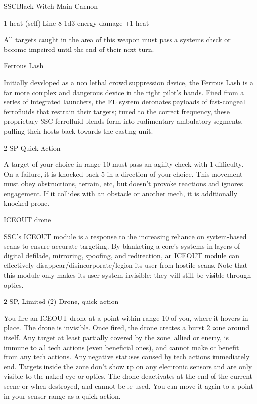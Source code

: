 \begin{mech}{SSC}{Black Witch}
Main Cannon

1 heat (self)
Line 8
1d3 energy damage +1 heat

All targets caught in the area of this weapon must pass a systems check or become impaired until the end of their next turn.


Ferrous Lash

Initially developed as a non lethal crowd suppression device, the Ferrous Lash is a far more complex and dangerous device in the right pilot’s hands. Fired from a series of integrated launchers, the FL system detonates payloads of fast-congeal ferrofluids that restrain their targets; tuned to the correct frequency, these proprietary SSC ferrofluid blends form into rudimentary ambulatory segments, pulling their hosts back towards the casting unit.

2 SP
Quick Action

A target of your choice in range 10 must pass an agility check with 1 difficulty. On a failure, it is knocked back 5 in a direction of your choice. This movement must obey obstructions, terrain, etc, but doesn't provoke reactions and ignores engagement. If it collides with an obstacle or another mech, it is additionally knocked prone.


ICEOUT drone

SSC’s ICEOUT module is a response to the increasing reliance on system-based scans to ensure accurate targeting. By blanketing a core’s systems in layers of digital defilade, mirroring, spoofing, and redirection, an ICEOUT module can effectively disappear/disincorporate/legion its user from hostile scans. Note that this module only makes its user system-invisible; they will still be visible through optics.

2 SP, Limited (2)
Drone, quick action

You fire an ICEOUT drone at a point within range 10 of you, where it hovers in place. The drone is invisible. Once fired, the drone creates a burst 2 zone around itself. Any target at least partially covered by the zone, allied or enemy, is immune to all tech actions (even beneficial ones), and cannot make or benefit from any tech actions. Any negative statuses caused by tech actions immediately end. Targets inside the zone don’t show up on any electronic sensors and are only visible to the naked eye or optics. The drone deactivates at the end of the current scene or when destroyed, and cannot be re-used. You can move it again to a point in your sensor range as a quick action.



\end{mech}
